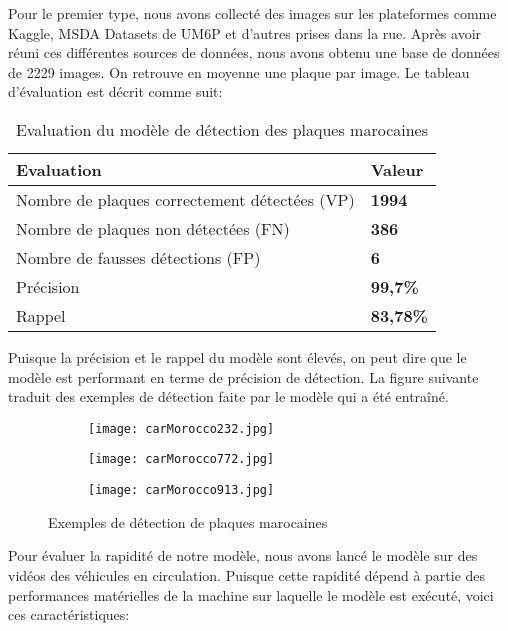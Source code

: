     
    Pour le premier type, nous avons collecté des images sur les plateformes comme Kaggle, MSDA Datasets de UM6P et d’autres prises dans la rue. Après avoir réuni ces différentes sources de données, nous avons obtenu une base de données de 2229 images. On retrouve en moyenne une plaque par image. Le tableau d’évaluation est décrit comme suit:
    \begin{table}[H]
        \centering
        \begin{tabular}{|l|l|}
            \hline
            \rowcolor{Gray}
            \textbf{Evaluation} & \textbf{Valeur} \\ \hline
            Nombre de plaques correctement détectées (VP) & \textbf{1994} \\ \hline
            Nombre de plaques non détectées (FN) & \textbf{386} \\ \hline
            Nombre de fausses détections (FP) & \textbf{6} \\ \hline
            Précision & \textbf{99,7\%} \\ \hline
            Rappel & \textbf{83,78\%} \\ \hline
        \end{tabular}
        \caption{Evaluation du modèle de détection des plaques marocaines}
    \end{table}
    Puisque la précision et le rappel du modèle sont élevés, on peut dire que le modèle est performant en terme de précision de détection. La figure suivante traduit des exemples de détection faite par le modèle qui a été entraîné.
    \begin{figure}[H]
        \begin{subfigure}{0.3\textwidth}
            \centering
            \texttt{[image: carMorocco232.jpg]}
        \end{subfigure}
        \hfill
        \begin{subfigure}{0.3\textwidth}
            \centering
            \texttt{[image: carMorocco772.jpg]}
        \end{subfigure}
        \hfill
        \begin{subfigure}{0.3\textwidth}
            \centering
            \texttt{[image: carMorocco913.jpg]}
        \end{subfigure}
        \caption{Exemples de détection de plaques marocaines}
    \end{figure}
    Pour évaluer la rapidité de notre modèle, nous avons lancé le modèle sur des vidéos des véhicules en circulation. Puisque cette rapidité dépend à partie des performances matérielles de la machine sur laquelle le modèle est exécuté, voici ces caractéristiques:
